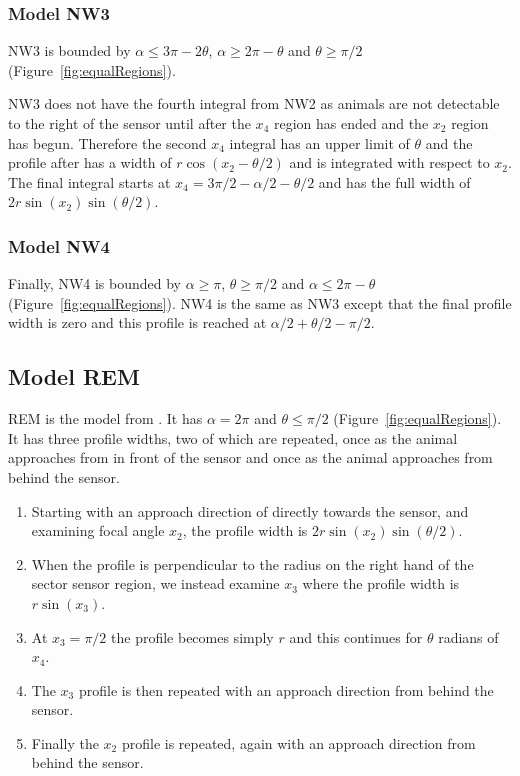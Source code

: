 \subsubsection{Model NW3} \label{NW3}

NW3 is bounded by $\alpha \le 3\pi - 2\theta$, $\alpha\ge 2\pi-\theta$ and $\theta\ge\pi/2$ (Figure~\ref{fig:equalRegions}).

NW3 does not have the fourth integral from NW2 as animals are not detectable to the right of the sensor until after the $x_4$ region has ended and the $x_2$ region has begun.
Therefore the second $x_4$ integral has an upper limit of $\theta $ and the profile after has a width of $r\cos(x_2 - \theta/2)$ and is integrated with respect to $x_2$.
The final integral starts at $x_4 = 3\pi/2 - \alpha/2 - \theta/2$ and has the full width of $2r\sin(x_2)\sin(\theta/2)$.



\subsubsection{Model NW4} \label{NW4}

Finally, NW4 is bounded by $\alpha\ge \pi$, $\theta\ge \pi/2$ and $\alpha \le 2\pi - \theta$ (Figure~\ref{fig:equalRegions}).
NW4 is the same as NW3 except that the final profile width is zero and this profile is reached at $\alpha/2+\theta/2-\pi/2$.




\subsection{Model REM} \label{REM}

REM is the model from \cite{rowcliffe2008estimating}.
It has $\alpha =2\pi$ and $\theta \le \pi/2$ (Figure~\ref{fig:equalRegions}).
It has three profile widths, two of which are repeated, once as the animal approaches from in front of the sensor and once as the animal approaches from behind the sensor.

\begin{enumerate}
\item Starting with an approach direction of directly towards the sensor, and examining focal angle $x_2$, the profile width is $2r\sin(x_2)\sin(\theta/2)$.
\item When the profile is perpendicular to the radius on the right hand of the sector sensor region, we instead examine $x_3$ where the profile width is $r\sin(x_3)$.
\item At $x_3=\pi/2$ the profile becomes simply $r$ and this continues for $\theta $ radians of $x_4$.
\item The $x_3$ profile is then repeated with an approach direction from behind the sensor.
\item Finally the $x_2$ profile is repeated, again with an approach direction from behind the sensor.
\end{enumerate}

